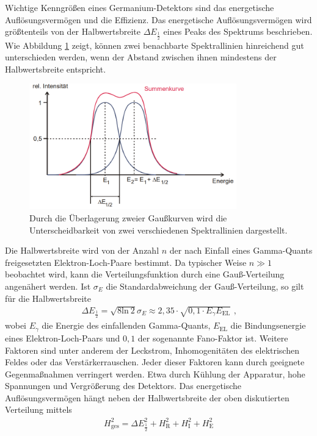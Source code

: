 Wichtige Kenngrößen eines Germanium-Detektors sind das energetische Auflösungsvermögen und die Effizienz.
Das energetische Auflösungsvermögen wird größtenteils von der Halbwertsbreite $\Delta E_{\frac{1}{2}}$ eines Peaks des Spektrums beschrieben. 
Wie Abbildung \ref{fig:halbwertsbreite} zeigt, können zwei benachbarte Spektrallinien hinreichend gut unterschieden werden, wenn der Abstand zwischen ihnen mindestens der Halbwertsbreite entspricht.
\begin{figure}
\centering
\includegraphics[width=0.8\textwidth]{content/skizzen/halbwertsbreite.png}
\caption{Durch die Überlagerung zweier Gaußkurven wird die Unterscheidbarkeit von zwei verschiedenen Spektrallinien dargestellt.}
\label{fig:halbwertsbreite}
\end{figure}
Die Halbwertsbreite wird von der Anzahl $n$ der nach Einfall eines Gamma-Quants freigesetzten Elektron-Loch-Paare bestimmt.
Da typischer Weise $n\gg 1$ beobachtet wird, kann die Verteilungsfunktion durch eine Gauß-Verteilung angenähert werden.
Ist $\sigma_E$ die Standardabweichung der Gauß-Verteilung, so gilt für die Halbwertsbreite
\begin{align}
\Delta E_{\frac{1}{2}} = \sqrt{8 \text{ln} ~2} \sigma_E \approx 2,35 \cdot \sqrt{0,1 \cdot E_{\gamma} E_{\text{EL}}} \text{ ,}
\label{eq:t:halbwertsbreite}
\end{align}
wobei $E_{\gamma}$ die Energie des einfallenden Gamma-Quants, $E_{\text{EL}}$ die Bindungsenergie eines Elektron-Loch-Paars und $0,1$ der sogenannte Fano-Faktor ist.
Weitere Faktoren sind unter anderem der Leckstrom, Inhomogenitäten des elektrischen Feldes oder das Verstärkerrauschen.
Jeder dieser Faktoren kann durch geeignete Gegenmaßnahmen verringert werden.
Etwa durch Kühlung der Apparatur, hohe Spannungen und Vergrößerung des Detektors.
Das energetische Auflösungsvermögen hängt neben der Halbwertsbreite der oben diskutierten Verteilung mittels
\begin{align}
H_\text{ges}^2 = \Delta E_{\frac{1}{2}}^2 + H_\text{R}^2 + H_\text{I}^2 + H_\text{E}^2
\end{align}
